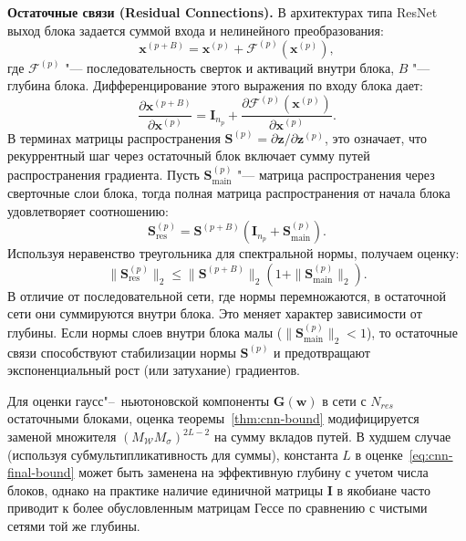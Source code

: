 \textbf{Остаточные связи (Residual Connections).} В архитектурах типа ResNet выход блока задается суммой входа и нелинейного преобразования:
\begin{equation}
    \mathbf{x}^{(p+B)} = \mathbf{x}^{(p)} + \mathcal{F}^{(p)}(\mathbf{x}^{(p)}),
\end{equation}
где $\mathcal{F}^{(p)}$ "--- последовательность сверток и активаций внутри блока, $B$ "--- глубина блока. Дифференцирование этого выражения по входу блока дает:
\begin{equation}
    \frac{\partial \mathbf{x}^{(p+B)}}{\partial \mathbf{x}^{(p)}} = \mathbf{I}_{n_p} + \frac{\partial \mathcal{F}^{(p)}(\mathbf{x}^{(p)})}{\partial \mathbf{x}^{(p)}}.
\end{equation}
В терминах матрицы распространения $\mathbf{S}^{(p)} = \partial \mathbf{z} / \partial \mathbf{z}^{(p)}$, это означает, что рекуррентный шаг через остаточный блок включает сумму путей распространения градиента. Пусть $\mathbf{S}^{(p)}_{\text{main}}$ "--- матрица распространения через сверточные слои блока, тогда полная матрица распространения от начала блока удовлетворяет соотношению:
\begin{equation}
    \mathbf{S}^{(p)}_{\text{res}} = \mathbf{S}^{(p+B)} \left( \mathbf{I}_{n_p} + \mathbf{S}^{(p)}_{\text{main}} \right).
\end{equation}
Используя неравенство треугольника для спектральной нормы, получаем оценку:
\begin{equation}
    \|\mathbf{S}^{(p)}_{\text{res}}\|_2 \leqslant \|\mathbf{S}^{(p+B)}\|_2 \left( 1 + \|\mathbf{S}^{(p)}_{\text{main}}\|_2 \right).
\end{equation}
В отличие от последовательной сети, где нормы перемножаются, в остаточной сети они суммируются внутри блока. Это меняет характер зависимости от глубины. Если нормы слоев внутри блока малы ($\|\mathbf{S}^{(p)}_{\text{main}}\|_2 < 1$), то остаточные связи способствуют стабилизации нормы $\mathbf{S}^{(p)}$ и предотвращают экспоненциальный рост (или затухание) градиентов. 

Для оценки гаусс"--~ньютоновской компоненты $\mathbf{G}(\mathbf{w})$ в сети с $N_{res}$ остаточными блоками, оценка теоремы~\ref{thm:cnn-bound} модифицируется заменой множителя $(M_{\mathcal{W}} M_{\sigma})^{2L-2}$ на сумму вкладов путей. В худшем случае (используя субмультипликативность для суммы), константа $L$ в оценке~\eqref{eq:cnn-final-bound} может быть заменена на эффективную глубину с учетом числа блоков, однако на практике наличие единичной матрицы $\mathbf{I}$ в якобиане часто приводит к более обусловленным матрицам Гессе по сравнению с чистыми сетями той же глубины.

